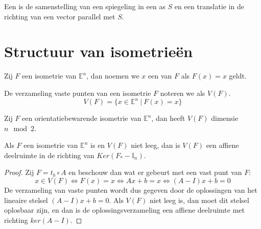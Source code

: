 \documentclass[main.tex]{subfiles}
\begin{document}
\begin{de} 
  \examen
  Een  is de samenstelling van een spiegeling in een as $S$ en een translatie in de richting van een vector parallel met $S$.
\end{de}

\section{Structuur van isometrie\"en}
\label{sec:struct-van-isom}

\begin{de}
  Zij $F$ een isometrie van $\mathbb{E}^{n}$, dan noemen we $x$ een  van $F$ als $F(x)=x$ geldt.
\end{de}

\begin{de}
  De verzameling vaste punten van een isometrie $F$ noteren we als $V(F)$.
  \[ V(F) = \{ x \in \mathbb{E}^{n} \ |\ F(x) = x \} \]
\end{de}

\begin{ei}
  \examen
  Zij $F$ een orientatiebewarende isometrie van $\mathbb{E}^{n}$, dan heeft $V(F)$ dimensie $n\mod 2$.
\end{ei}

\begin{st}
  Als $F$ een isometrie van $\mathbb{E}^{n}$ is en $V(F)$ niet leeg, dan is $V(F)$ een affiene deelruimte in de richting van $Ker(F_{*}-\mathbb{I}_{n})$.

  \begin{proof}
    Zij $F=t_{b} \circ A$ en beschouw dan wat er gebeurt met een vast punt van $F$:
    \[ x\in V(F) \Leftrightarrow F(x) = x \Leftrightarrow Ax+b=x \Leftrightarrow (A-I)x+b = 0 \]
    De verzameling van vaste punten wordt dus gegeven door de oplossingen van het lineaire stelsel $(A-I)x+b=0$.
    Als $V(F)$ niet leeg is, dan moet dit stelsel oplosbaar zijn, en dan is de oplossingsverzameling een affiene deelruimte met richting $ker(A-I)$.
  \end{proof}
\end{st}
\end{document}
